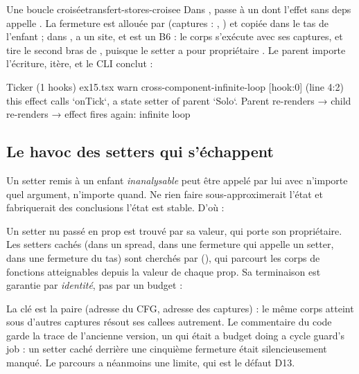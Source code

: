 \begin{exemple}{Une boucle croisée}{transfert-stores-croisee}
  Dans ,  passe
   à un  dont l'effet sans deps
  appelle . La fermeture est allouée par 
  (captures : , ) et copiée dans le tas de l'enfant ; dans
  ,  a un site, et  est un B6 : le
  corps s'exécute avec ses captures, et  tire le second
  bras de , puisque le setter a pour propriétaire
  . Le parent importe l'écriture, itère, et le CLI conclut :
\begin{sortie}
  Ticker  (1 hooks)  ex15.tsx
    warn   cross-component-infinite-loop  [hook:0]  (line 4:2)  this effect calls `onTick`, a state setter of parent `Solo`. Parent re-renders → child re-renders → effect fires again: infinite loop
\end{sortie}
\end{exemple}

\subsection{Le havoc des setters qui s'échappent}

Un setter remis à un enfant \emph{inanalysable} peut être appelé par lui
avec n'importe quel argument, n'importe quand. Ne rien faire
sous-approximerait l'état et fabriquerait des conclusions \og l'état est
stable\fg{}. D'où :


Un setter nu passé en prop est trouvé par sa valeur, qui porte son
propriétaire. Les setters cachés (dans un spread, dans une fermeture qui
appelle un setter, dans une fermeture du tas) sont cherchés par
(), qui parcourt les corps
de fonctions atteignables depuis la valeur de chaque prop. Sa terminaison
est garantie par \emph{identité}, pas par un budget :


La clé est la paire (adresse du CFG, adresse des captures) : le même corps
atteint sous d'autres captures résout ses callees autrement. Le commentaire
du code garde la trace de l'ancienne version, un  qui était
\og a budget doing a cycle guard's job\fg{} : un setter caché derrière une
cinquième fermeture était silencieusement manqué. Le parcours a néanmoins
une limite, qui est le défaut D13.


